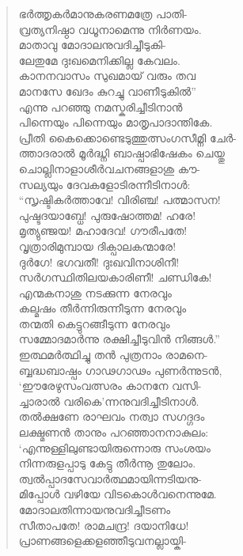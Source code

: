 \begin{verse}
ഭര്‍ത്തൃകര്‍മാനുകരണമത്രേ പാതി-\\
വ്രത്യനിഷ്ഠാ വധൂനാമെന്നു നിര്‍ണയം.\\
മാതാവു മോദാലനുവദിച്ചീടുകി-\\
ലേതുമേ ദുഃഖമെനിക്കില്ല കേവലം.\\
കാനനവാസം സുഖമായ് വരും തവ\\
മാനസേ ഖേദം കുറച്ചു വാണീടുകില്‍”\\
എന്നു പറഞ്ഞു നമസ്കരിച്ചീടിനാന്‍\\
പിന്നെയും പിന്നെയും മാതൃപാദാന്തികേ.\\
പ്രീതി കൈക്കൊണ്ടെടുത്തുത്സംഗസീമ്നി ചേര്‍-\\
ത്താദരാല്‍ മൂര്‍ദ്ധ്നി ബാഷ്പാഭിഷേകം ചെയ്തു\\
ചൊല്ലിനാളാശീര്‍വചനങ്ങളാശു കൗ-\\
സല്യയും ദേവകളോടിരന്നീടിനാള്‍:\\
“സൃഷ്ടികര്‍ത്താവേ! വിരിഞ്ച! പത്മാസന!\\
പുഷ്ടദയാബ്ധേ! പുരുഷോത്തമ! ഹരേ!\\
മൃത്യുഞ്ജയ! മഹാദേവ! ഗൗരീപതേ!\\
വൃത്രാരിമുമ്പായ ദിക്പാലകന്മാരേ!\\
ദുര്‍ഗേ! ഭഗവതീ! ദുഃഖവിനാശിനീ!\\
സര്‍ഗസ്ഥിതിലയകാരിണീ! ചണ്ഡികേ!\\
എന്മകനാശു നടക്കുന്ന നേരവും\\
കല്മഷം തീര്‍ന്നിരുന്നീടുന്ന നേരവും\\
തന്മതി കെട്ടുറങ്ങീടുന്ന നേരവും\\
സമ്മോദമാര്‍ന്നു രക്ഷിച്ചീടുവിന്‍ നിങ്ങള്‍.”\\
ഇത്ഥമര്‍ത്ഥിച്ചു തന്‍ പുത്രനാം രാമനെ-\\
ബ്ബദ്ധബാഷ്പം ഗാഢഗാഢം പുണര്‍ന്നുടന്‍,\\
‘ഈരേഴുസംവത്സരം കാനനേ വസി-\\
ച്ചാരാല്‍ വരികെ’ന്നനുവദിച്ചീടിനാള്‍.\\
തല്‍ക്ഷണേ രാഘവം നത്വാ സഗദ്ഗദം\\
ലക്ഷ്മണന്‍ താനും പറഞ്ഞാനനാകുലം:\\
‘എന്നുള്ളിലുണ്ടായിരുന്നൊരു സംശയം\\
നിന്നരുളപ്പാടു കേട്ടു തീര്‍ന്നൂ തുലോം.\\
ത്വല്‍പ്പാദസേവാര്‍ത്ഥമായിന്നടിയനു-\\
മിപ്പോള്‍ വഴിയേ വിടകൊള്‍വനെന്നുമേ.\\
മോദാലതിന്നായനുവദിച്ചീടണം\\
സീതാപതേ! രാമചന്ദ്ര! ദയാനിധേ!\\
പ്രാണങ്ങളെക്കളഞ്ഞീടുവനല്ലായ്കി-\\

\end{verse}
